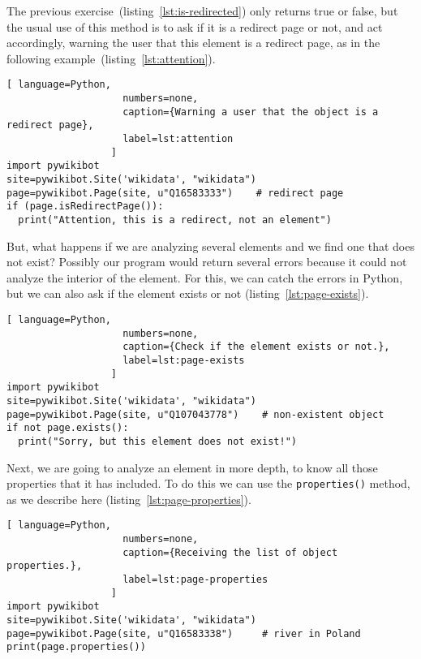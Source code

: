 The previous exercise~(listing~\ref{lst:is-redirected}) only returns true or false, but the usual use of this method is to ask if it is a redirect page or not, and act accordingly, warning the user that this element is a redirect page, as in the following example~(listing~\ref{lst:attention}).

\begin{lstlisting}[ language=Python,
                    numbers=none,
                    caption={Warning a user that the object is a redirect page},
                    label=lst:attention
                  ]
import pywikibot
site=pywikibot.Site('wikidata', "wikidata")
page=pywikibot.Page(site, u"Q16583333")    # redirect page
if (page.isRedirectPage()):
  print("Attention, this is a redirect, not an element")
\end{lstlisting}

But, what happens if we are analyzing several elements and we find one that does not exist? Possibly our program would return several errors because it could not analyze the interior of the element. For this, we can catch the errors in Python, but we can also ask if the element exists or not (listing~\ref{lst:page-exists}).

\begin{lstlisting}[ language=Python,
                    numbers=none,
                    caption={Check if the element exists or not.},
                    label=lst:page-exists
                  ]
import pywikibot
site=pywikibot.Site('wikidata', "wikidata")
page=pywikibot.Page(site, u"Q107043778")    # non-existent object
if not page.exists():
  print("Sorry, but this element does not exist!")
\end{lstlisting}

Next, we are going to analyze an element in more depth, to know all those properties that it has included. To do this we can use the \lstinline|properties()| method, as we describe here (listing~\ref{lst:page-properties}).

\begin{lstlisting}[ language=Python,
                    numbers=none,
                    caption={Receiving the list of object properties.},
                    label=lst:page-properties
                  ]
import pywikibot
site=pywikibot.Site('wikidata', "wikidata")
page=pywikibot.Page(site, u"Q16583338")     # river in Poland
print(page.properties())
\end{lstlisting}

